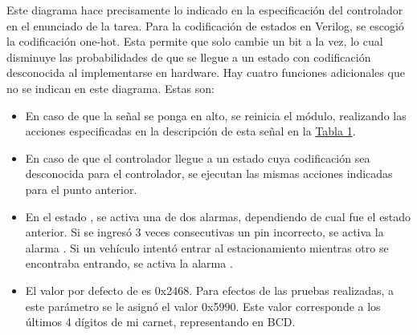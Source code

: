Este diagrama hace precisamente lo indicado en la especificación del controlador en el enunciado de la tarea. 
Para la codificación de estados en Verilog, se escogió la codificación one-hot. 
Esta permite que solo cambie un bit a la vez, lo cual disminuye las probabilidades de que se llegue a un estado con codificación desconocida al implementarse en hardware. 
Hay cuatro funciones adicionales que no se indican en este diagrama. Estas son:
\begin{itemize}
    \item En caso de que la señal  se ponga en alto, se reinicia el módulo, realizando las acciones especificadas en la descripción de esta señal en la \hyperref[t1]{Tabla 1}.
    \item En caso de que el controlador llegue a un estado cuya codificación sea desconocida para el controlador, se ejecutan las mismas acciones indicadas para el punto anterior.
    \item En el estado , se activa una de dos alarmas, dependiendo de cual fue el estado anterior. Si se ingresó 3 veces consecutivas un pin incorrecto, se activa la alarma . Si un vehículo intentó entrar al estacionamiento mientras otro se encontraba entrando, se activa la alarma .
    \item El valor por defecto de  es 0x2468. Para efectos de las pruebas realizadas, a este parámetro se le asignó el valor 0x5990. Este valor corresponde a los últimos 4 dígitos de mi carnet, representando en BCD.
\end{itemize}
